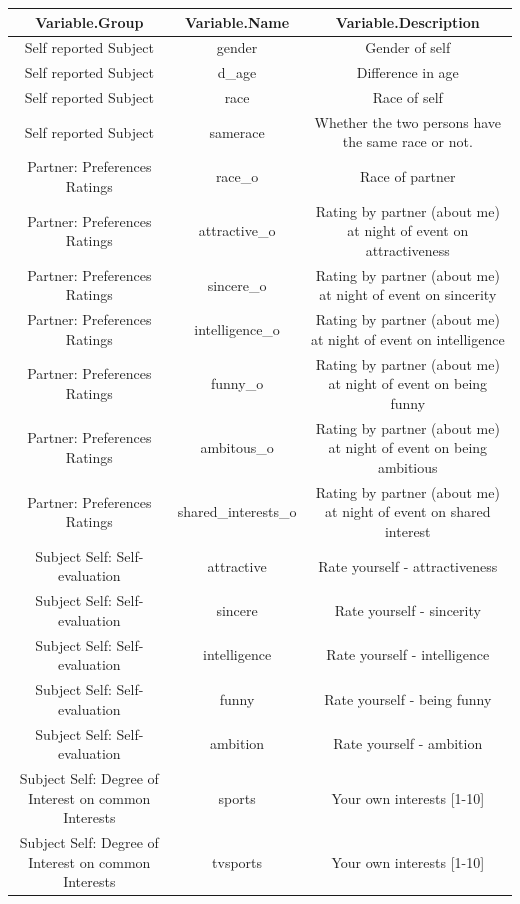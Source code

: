 \documentclass[
  letterpaper,
  DIV=11,
  numbers=noendperiod]{scrartcl}
\begin{document}
\begin{table}
\fontsize{12.0pt}{14.4pt}\selectfont
\begin{tabular*}{\linewidth}{@{\extracolsep{\fill}}ccc}
\toprule
Variable.Group & Variable.Name & Variable.Description \\ 
\midrule\addlinespace[2.5pt]
Self reported Subject & gender & Gender of self \\ 
Self reported Subject & d\_age & Difference in age \\ 
Self reported Subject & race & Race of self \\ 
Self reported Subject & samerace & Whether the two persons have the same race or not. \\ 
Partner: Preferences Ratings & race\_o & Race of partner \\ 
Partner: Preferences Ratings & attractive\_o & Rating by partner (about me) at night of event on attractiveness \\ 
Partner: Preferences Ratings & sincere\_o & Rating by partner (about me) at night of event on sincerity \\ 
Partner: Preferences Ratings & intelligence\_o & Rating by partner (about me) at night of event on intelligence \\ 
Partner: Preferences Ratings & funny\_o & Rating by partner (about me) at night of event on being funny \\ 
Partner: Preferences Ratings & ambitous\_o & Rating by partner (about me) at night of event on being ambitious \\ 
Partner: Preferences Ratings & shared\_interests\_o & Rating by partner (about me) at night of event on shared interest \\ 
Subject Self: Self-evaluation & attractive & Rate yourself - attractiveness \\ 
Subject Self: Self-evaluation & sincere & Rate yourself - sincerity \\ 
Subject Self: Self-evaluation & intelligence & Rate yourself - intelligence \\ 
Subject Self: Self-evaluation & funny & Rate yourself - being funny \\ 
Subject Self: Self-evaluation & ambition & Rate yourself - ambition \\ 
Subject Self: Degree of Interest on common Interests & sports & Your own interests [1-10] \\ 
Subject Self: Degree of Interest on common Interests & tvsports & Your own interests [1-10] \\ 

\end{tabular*}
\end{table}
\end{document}
